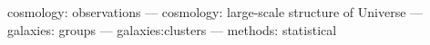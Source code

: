 \begin{abstract}

\blindtext

\end{abstract}
\begin{keywords}
cosmology: observations --- cosmology: large-scale structure
            of Universe --- galaxies: groups --- galaxies:clusters
            --- methods: statistical
\end{keywords}